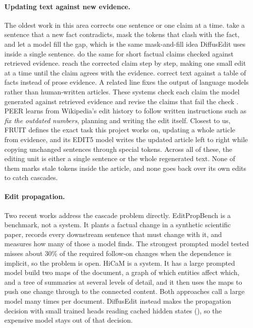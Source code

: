 \documentclass[]{paper}
\begin{document}
\paragraph{Updating text against new evidence.}
The oldest work in this area corrects one sentence or one claim at a time. \citet{shah-etal-2020-automatic} take a sentence that a new fact contradicts, mask the tokens that clash with the fact, and let a model fill the gap, which is the same mask-and-fill idea DiffusEdit uses inside a single sentence. \citet{thorne-vlachos-2021-evidence} do the same for short factual claims checked against retrieved evidence. \citet{chen-etal-2022-converge} reach the corrected claim step by step, making one small edit at a time until the claim agrees with the evidence. \citet{iso-etal-2020-fact} correct text against a table of facts instead of prose evidence. A related line fixes the output of language models rather than human-written articles. These systems check each claim the model generated against retrieved evidence and revise the claims that fail the check \citep{gao-etal-2023-rarr, krishna-etal-2024-genaudit}. PEER \citep{schick-etal-2022-peer} learns from Wikipedia's edit history to follow written instructions such as \emph{fix the outdated numbers}, planning and writing the edit itself. Closest to us, FRUIT \citep{iv-etal-2022-fruit} defines the exact task this project works on, updating a whole article from evidence, and its EDIT5 model writes the updated article left to right while copying unchanged sentences through special tokens. Across all of these, the editing unit is either a single sentence or the whole regenerated text. None of them marks stale tokens inside the article, and none goes back over its own edits to catch cascades.

\paragraph{Edit propagation.}
Two recent works address the cascade problem directly. EditPropBench \citep{kruthof-2026-editpropbench} is a benchmark, not a system. It plants a factual change in a synthetic scientific paper, records every downstream sentence that must change with it, and measures how many of those a model finds. The strongest prompted model tested misses about 30\% of the required follow-on changes when the dependence is implicit, so the problem is open. HiCaM \citep{shi-etal-2025-hicam} is a system. It has a large prompted model build two maps of the document, a graph of which entities affect which, and a tree of summaries at several levels of detail, and it then uses the maps to push one change through to the connected content. Both approaches call a large model many times per document. DiffusEdit instead makes the propagation decision with small trained heads reading cached hidden states (), so the expensive model stays out of that decision.
\end{document}

